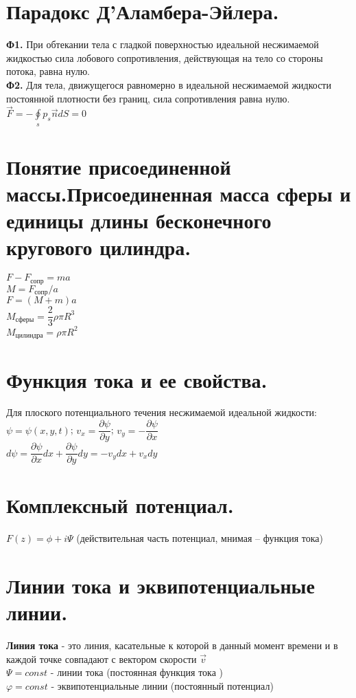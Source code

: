 \begin{multicols*}{3}
		\section{Парадокс Д’Аламбера-Эйлера.}
		\textbf{Ф1.} При обтекании тела с гладкой поверхностью идеальной
		несжимаемой жидкостью сила лобового сопротивления, действующая на тело
		со стороны потока, равна нулю. \\
		\textbf{Ф2.} Для тела, движущегося равномерно в идеальной несжимаемой жидкости постоянной плотности без границ, сила сопротивления равна
		нулю.\\
		$\vec{F}=-\oint\limits_sp_s\vec{n}dS=0$
		
		\section{Понятие присоединенной массы.Присоединенная масса сферы и единицы длины бесконечного кругового цилиндра.}
		$F-F_\text{сопр}=ma$ \\
		$M=F_\text{сопр}/a$ \\
		$F=(M+m)a$ \\ 
		$M_\text{сферы}=\dfrac{2}{3}\rho\pi R^3$ \\
		$M_\text{цилиндра}=\rho\pi R^2$
		
		\section{Функция тока и ее свойства.}
		Для плоского потенциального течения несжимаемой идеальной жидкости: \\
		$\psi = \psi (x, y, t)$; $v_{x}=\dfrac{\partial\psi}{\partial y}$; $v_{y}=-\dfrac{\partial\psi}{\partial x}$ \\
		$d\psi = \dfrac{\partial\psi}{\partial x}dx + \dfrac{\partial\psi}{\partial y}dy = -v_{y}dx + v_{x}dy$
		
		\section{Комплексный потенциал.}
		$F(z)=\phi+i\Psi$ (действительная часть
		потенциал, мнимая – функция тока)
		
		\section{Линии тока и эквипотенциальные линии.}
		\textbf{Линия тока} - это линия, касательные к которой в данный момент времени и
		в каждой точке совпадают с вектором скорости  $\vec{v}$ \\
		$\Psi = const$ - линии тока (постоянная функция тока ) \\
		$\varphi = const$ - эквипотенциальные линии (постоянный потенциал)
		

\end{multicols*}
